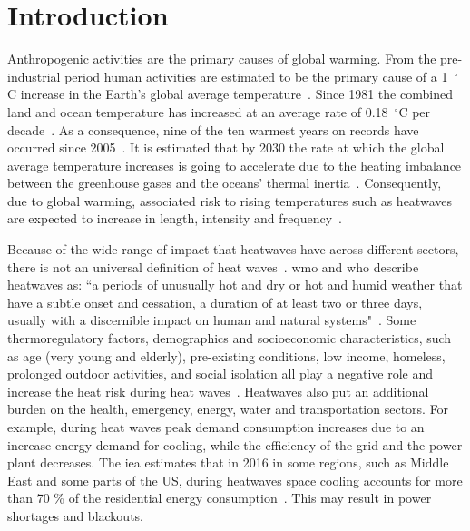 
\section{Introduction}\label{sec:introduction}

Anthropogenic activities are the primary causes of global warming.
From the pre-industrial period human activities are estimated to be the primary cause of a 1~$^{\circ}$C increase in the Earth's global average temperature~\cite{GlobalWa91:online}.
Since 1981 the combined land and ocean temperature has increased at an average rate of 0.18~$^{\circ}$C per decade~\cite{GlobalCl28:online}.
As a consequence, nine of the ten warmest years on records have occurred since 2005~\cite{ClimateC26:online}.
It is estimated that by 2030 the rate at which the global average temperature increases is going to accelerate due to the heating imbalance between the greenhouse gases and the oceans' thermal inertia~\cite{ClimateC26:online}.
Consequently, due to global warming, associated risk to rising temperatures such as heatwaves are expected to increase in length, intensity and frequency~\cite{Whatharm75:online}.

Because of the wide range of impact that heatwaves have across different sectors, there is not an universal definition of heat waves~\cite{Perkins2013}. \ac{wmo} and \ac{who} describe heatwaves as: ``a periods of unusually hot and dry or hot and humid weather that have a subtle onset and cessation, a duration of at least two or three days, usually with a discernible impact on human and natural systems"~\cite{WMO2015}.
Some thermoregulatory factors, demographics and socioeconomic characteristics, such as age (very young and elderly), pre-existing conditions, low income, homeless, prolonged outdoor activities, and social isolation all play a negative role and increase the heat risk during heat waves~\cite{WMO2015}.
Heatwaves also put an additional burden on the health, emergency, energy, water and transportation sectors.
For example, during heat waves peak demand consumption increases due to an increase energy demand for cooling, while the efficiency of the grid and the power plant decreases.
The \ac{iea} estimates that in 2016 in some regions, such as Middle East and some parts of the US, during heatwaves space cooling accounts for more than 70 \% of the residential energy consumption~\cite{IEA2018}.
This may result in power shortages and blackouts.


